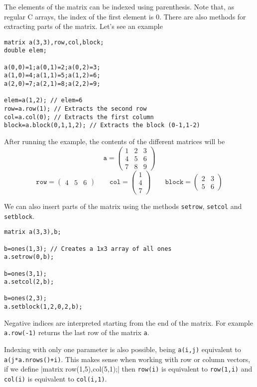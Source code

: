The elements of the matrix can be indexed using parenthesis. Note that, as regular C arrays, the index
of the first element is 0. There are also methods for extracting parts of the matrix. Let's see an example
\begin{verbatim}
matrix a(3,3),row,col,block;
double elem;

a(0,0)=1;a(0,1)=2;a(0,2)=3;
a(1,0)=4;a(1,1)=5;a(1,2)=6;
a(2,0)=7;a(2,1)=8;a(2,2)=9;

elem=a(1,2); // elem=6
row=a.row(1); // Extracts the second row
col=a.col(0); // Extracts the first column
block=a.block(0,1,1,2); // Extracts the block (0-1,1-2)

\end{verbatim} 
After running the example, the contents of the different matrices will be
$$
\mathtt{a}=\left(
\begin{array}{ccc}
1&2&3\\4&5&6\\7&8&9
\end{array}
\right)
$$
$$
\mathtt{row}=\left(
\begin{array}{ccc}
4&5&6
\end{array}
\right)
\qquad
\mathtt{col}=\left(
\begin{array}{c}
1\\4\\7
\end{array}
\right)
\qquad
\mathtt{block}=\left(
\begin{array}{cc}
2&3\\5&6
\end{array}
\right)
$$

We can also insert parts of the matrix using the methods {\tt setrow}, {\tt setcol} and {\tt setblock}.
\begin{verbatim}
matrix a(3,3),b;

b=ones(1,3); // Creates a 1x3 array of all ones
a.setrow(0,b);

b=ones(3,1);
a.setcol(2,b);

b=ones(2,3);
a.setblock(1,2,0,2,b);

\end{verbatim} 

Negative indices are interpreted starting from the end of the matrix. For example {\tt a.row(-1)} returns
the last row of the matrix {\tt a}.  

Indexing with only one parameter is also possible, being \verb|a(i,j)| equivalent to 
\verb|a(j*a.nrows()+i)|. This makes sense when working with row or column vectors, if we define
|matrix row(1,5),col(5,1);|
then \verb|row(i)| is equivalent to \verb|row(1,i)| and \verb|col(i)| is equivalent to \verb|col(i,1)|.

